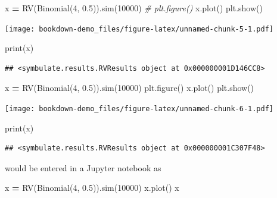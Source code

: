 \documentclass[
]{book}
\newenvironment{Shaded}{\begin{snugshade}}{\end{snugshade}}
\newcommand{\BuiltInTok}[1]{#1}
\newcommand{\CommentTok}[1]{\textcolor[rgb]{0.56,0.35,0.01}{\textit{#1}}}
\newcommand{\DecValTok}[1]{\textcolor[rgb]{0.00,0.00,0.81}{#1}}
\newcommand{\FloatTok}[1]{\textcolor[rgb]{0.00,0.00,0.81}{#1}}
\newcommand{\NormalTok}[1]{#1}
\newcommand{\OperatorTok}[1]{\textcolor[rgb]{0.81,0.36,0.00}{\textbf{#1}}}
\theoremstyle{definition}
\theoremstyle{definition}
\theoremstyle{definition}
\theoremstyle{remark}
\begin{document}
\begin{Shaded}
\begin{Highlighting}[]
\NormalTok{x }\OperatorTok{=}\NormalTok{ RV(Binomial(}\DecValTok{4}\NormalTok{, }\FloatTok{0.5}\NormalTok{)).sim(}\DecValTok{10000}\NormalTok{)}
\CommentTok{\# plt.figure()}
\NormalTok{x.plot()}
\NormalTok{plt.show()}
\end{Highlighting}
\end{Shaded}

\texttt{[image: bookdown-demo\_files/figure-latex/unnamed-chunk-5-1.pdf]}

\begin{Shaded}
\begin{Highlighting}[]
\BuiltInTok{print}\NormalTok{(x)}
\end{Highlighting}
\end{Shaded}

\begin{verbatim}
## <symbulate.results.RVResults object at 0x000000001D146CC8>
\end{verbatim}

\begin{Shaded}
\begin{Highlighting}[]
\NormalTok{x }\OperatorTok{=}\NormalTok{ RV(Binomial(}\DecValTok{4}\NormalTok{, }\FloatTok{0.5}\NormalTok{)).sim(}\DecValTok{10000}\NormalTok{)}
\NormalTok{plt.figure()}
\NormalTok{x.plot()}
\NormalTok{plt.show()}
\end{Highlighting}
\end{Shaded}

\texttt{[image: bookdown-demo\_files/figure-latex/unnamed-chunk-6-1.pdf]}

\begin{Shaded}
\begin{Highlighting}[]
\BuiltInTok{print}\NormalTok{(x)}
\end{Highlighting}
\end{Shaded}

\begin{verbatim}
## <symbulate.results.RVResults object at 0x000000001C307F48>
\end{verbatim}

would be entered in a Jupyter notebook as

\begin{Shaded}
\begin{Highlighting}[]
\NormalTok{x }\OperatorTok{=}\NormalTok{ RV(Binomial(}\DecValTok{4}\NormalTok{, }\FloatTok{0.5}\NormalTok{)).sim(}\DecValTok{10000}\NormalTok{)}
\NormalTok{x.plot()}
\NormalTok{x}
\end{Highlighting}
\end{Shaded}
\end{document}
